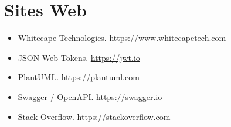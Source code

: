 \section*{Sites Web}

\begin{itemize}
  \item Whitecape Technologies. \url{https://www.whitecapetech.com}
  \item JSON Web Tokens. \url{https://jwt.io}
  \item PlantUML. \url{https://plantuml.com}
  \item Swagger / OpenAPI. \url{https://swagger.io}
  \item Stack Overflow. \url{https://stackoverflow.com}
\end{itemize}

